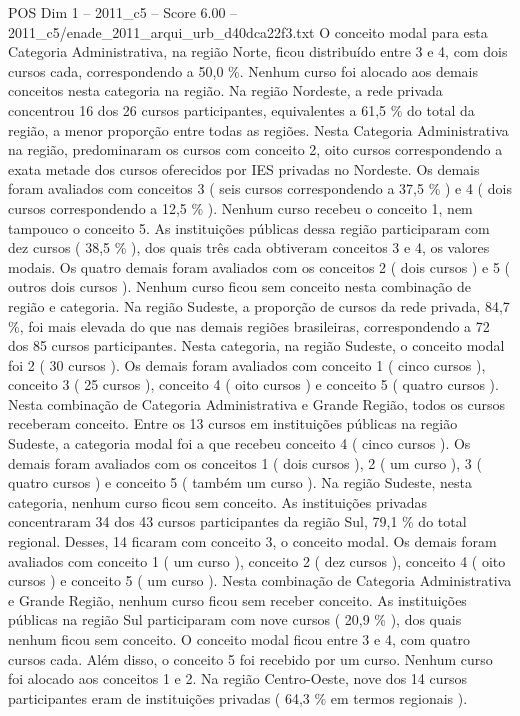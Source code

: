 \begin{textsample}{POS Dim 1 – 2011\_c5 – Score 6.00 – 2011\_c5/enade\_2011\_arqui\_urb\_d40dca22f3.txt}
O conceito modal para esta Categoria Administrativa, na região Norte, ficou distribuído entre 3 e 4, com dois cursos cada, correspondendo a 50,0 \%.
Nenhum curso foi alocado aos demais conceitos nesta categoria na região.
Na região Nordeste, a rede privada concentrou 16 dos 26 cursos participantes, equivalentes a 61,5 \% do total da região, a menor proporção entre todas as regiões.
Nesta Categoria Administrativa na região, predominaram os cursos com conceito 2, oito cursos correspondendo a exata metade dos cursos oferecidos por IES privadas no Nordeste.
Os demais foram avaliados com conceitos 3 ( seis cursos correspondendo a 37,5 \% ) e 4 ( dois cursos correspondendo a 12,5 \% ).
Nenhum curso recebeu o conceito 1, nem tampouco o conceito 5.
As instituições públicas dessa região participaram com dez cursos ( 38,5 \% ), dos quais três cada obtiveram conceitos 3 e 4, os valores modais.
Os quatro demais foram avaliados com os conceitos 2 ( dois cursos ) e 5 ( outros dois cursos ).
Nenhum curso ficou sem conceito nesta combinação de região e categoria.
Na região Sudeste, a proporção de cursos da rede privada, 84,7 \%, foi mais elevada do que nas demais regiões brasileiras, correspondendo a 72 dos 85 cursos participantes.
Nesta categoria, na região Sudeste, o conceito modal foi 2 ( 30 cursos ).
Os demais foram avaliados com conceito 1 ( cinco cursos ), conceito 3 ( 25 cursos ), conceito 4 ( oito cursos ) e conceito 5 ( quatro cursos ).
Nesta combinação de Categoria Administrativa e Grande Região, todos os cursos receberam conceito.
Entre os 13 cursos em instituições públicas na região Sudeste, a categoria modal foi a que recebeu conceito 4 ( cinco cursos ).
Os demais foram avaliados com os conceitos 1 ( dois cursos ), 2 ( um curso ), 3 ( quatro cursos ) e conceito 5 ( também um curso ).
Na região Sudeste, nesta categoria, nenhum curso ficou sem conceito.
As instituições privadas concentraram 34 dos 43 cursos participantes da região Sul, 79,1 \% do total regional.
Desses, 14 ficaram com conceito 3, o conceito modal.
Os demais foram avaliados com conceito 1 ( um curso ), conceito 2 ( dez cursos ), conceito 4 ( oito cursos ) e conceito 5 ( um curso ).
Nesta combinação de Categoria Administrativa e Grande Região, nenhum curso ficou sem receber conceito.
As instituições públicas na região Sul participaram com nove cursos ( 20,9 \% ), dos quais nenhum ficou sem conceito.
O conceito modal ficou entre 3 e 4, com quatro cursos cada.
Além disso, o conceito 5 foi recebido por um curso.
Nenhum curso foi alocado aos conceitos 1 e 2.
Na região Centro-Oeste, nove dos 14 cursos participantes eram de instituições privadas ( 64,3 \% em termos regionais ).

\end{textsample}
